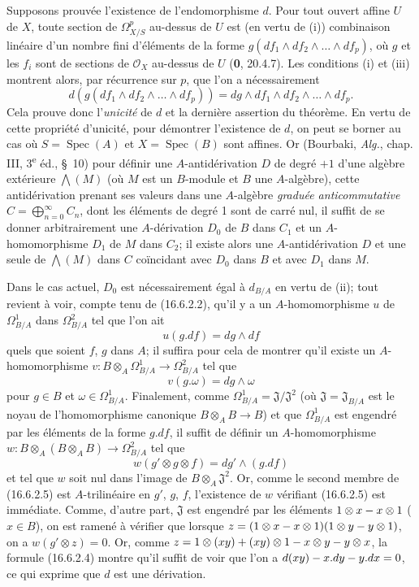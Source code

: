 Supposons prouvée l'existence de l'endomorphisme $d$. Pour tout ouvert affine
$U$ de $X$, toute section de $\varOmega_{X/S}^p$ au-dessus de $U$ est (en vertu
de (i)) combinaison linéaire d'un nombre fini d'éléments de la forme
$g(df_1\wedge df_2\wedge\ldots\wedge df_p)$, où $g$ et les $f_i$ sont de
sections de $\mathcal{O}_X$ au-dessus de $U$ (\textbf{0}, 20.4.7). Les conditions (i)
et (iii) montrent alors, par récurrence sur $p$, que l'on a nécessairement
\[
  d(g(df_1\wedge df_2\wedge\ldots\wedge df_p))
  =dg\wedge df_1\wedge df_2\wedge\ldots\wedge df_p.
  \tag{16.6.2.2}
  \label{IV.16.6.2.2}
\]
Cela prouve donc l'\emph{unicité} de $d$ et la dernière assertion du théorème.
En vertu de cette propriété d'unicité, pour démontrer l'existence de $d$, on
peut se borner au cas où $S=\operatorname{Spec}(A)$ et
$X=\operatorname{Spec}(B)$ sont affines. Or (Bourbaki, \emph{Alg.}, chap.
III, 3\textsuperscript{e} éd., \S~10) pour définir une $A$-antidérivation
$D$ de degré $+1$ d'une algèbre extérieure $\bigwedge(M)$ (où $M$ est un
$B$-module et $B$ une $A$-algèbre), cette antidérivation prenant ses valeurs
dans une $A$-algèbre \emph{graduée anticommutative}
$C=\bigoplus_{n=0}^{\infty}C_n$, dont les éléments de degré 1 sont de carré
nul, il suffit de se donner arbitrairement une $A$-dérivation $D_0$ de $B$
dans $C_1$ et un $A$-homomorphisme $D_1$ de $M$ dans $C_2$; il existe alors
une $A$-antidérivation $D$ et une seule de $\bigwedge(M)$ dans $C$
coïncidant avec $D_0$ dans $B$ et avec $D_1$ dans $M$.

Dans le cas actuel, $D_0$ est nécessairement égal à $d_{B/A}$ en vertu de
(ii); tout revient à voir, compte tenu de (16.6.2.2), qu'il y a un
$A$-homomorphisme $u$ de $\Omega_{B/A}^1$ dans $\Omega_{B/A}^2$ tel que
l'on ait
\[
  u(g.df)=dg\wedge df
  \tag{16.6.2.3}
  \label{IV.16.6.2.3}
\]
quels que soient $f$, $g$ dans $A$; il suffira pour cela de montrer qu'il
existe un $A$-homomorphisme
$v:B\otimes_A\Omega_{B/A}^1\to\Omega_{B/A}^2$ tel que
\[
  v(g.\omega)=dg\wedge\omega
  \tag{16.6.2.4}
  \label{IV.16.6.2.4}
\]
pour $g\in B$ et $\omega\in\Omega_{B/A}^1$. Finalement, comme
$\Omega_{B/A}^1=\mathfrak{J}/\mathfrak{J}^2$ (où
$\mathfrak{J}=\mathfrak{J}_{B/A}$ est le noyau de l'homomorphisme canonique
$B\otimes_A B\to B$) et que $\Omega_{B/A}^1$ est engendré par les éléments
de la forme $g.df$, il suffit de définir un $A$-homomorphisme
$w:B\otimes_A(B\otimes_A B)\to\Omega_{B/A}^2$ tel que
\[
  w(g'\otimes g\otimes f)=dg'\wedge(g.df)
  \tag{16.6.2.5}
  \label{IV.16.6.2.5}
\]
et tel que $w$ soit nul dans l'image de $B\otimes_A\mathfrak{J}^2$. Or,
comme le second membre de (16.6.2.5) est $A$-trilinéaire en $g'$, $g$, $f$,
l'existence de $w$ vérifiant (16.6.2.5) est immédiate. Comme, d'autre part,
$\mathfrak{J}$ est engendré par les éléments $1\otimes x- x\otimes1$
($x\in B$), on est ramené à vérifier que lorsque
$z=(1\otimes x- x\otimes1)(1\otimes y- y\otimes1)$, on a
$w(g'\otimes z)=0$. Or, comme
$z=1\otimes(xy)+(xy)\otimes1- x\otimes y- y\otimes x$, la formule (16.6.2.4)
montre qu'il
suffit de voir que l'on a $d(xy)- x.dy- y.dx=0$, ce qui exprime que $d$ est une
dérivation.


